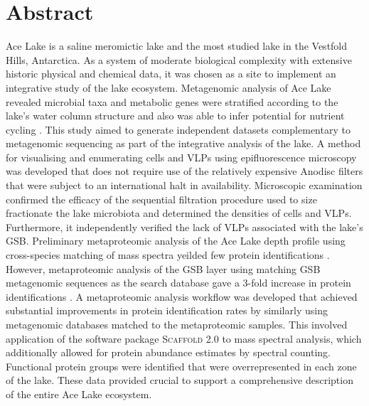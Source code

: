 \section{Abstract}
Ace Lake is a saline meromictic lake and the most studied lake in the Vestfold Hills, Antarctica.
As a system of moderate biological complexity with extensive historic physical and chemical data, it was chosen as a site to implement an integrative study of the lake ecosystem.
Metagenomic analysis of Ace Lake revealed microbial taxa and metabolic genes were stratified according to the lake's water column structure and also was able to infer potential for nutrient cycling \cite{Lauro2011}.
This study aimed to generate independent datasets complementary to metagenomic sequencing as part of the integrative analysis of the lake.
A method for visualising and enumerating cells and \acp{VLP} using epifluorescence microscopy was developed that does not require use of the relatively expensive Anodisc filters that were subject to an international halt in availability.
Microscopic examination confirmed the efficacy of the sequential filtration procedure used to size fractionate the lake microbiota and determined the densities of cells and \acp{VLP}. Furthermore, it independently verified the lack of \acp{VLP} associated with the lake's \ac{GSB}.
Preliminary metaproteomic analysis of the Ace Lake depth profile using cross-species matching of mass spectra yeilded few protein identifications \cite{Ng2010b}.
However, metaproteomic analysis of the \ac{GSB} layer using matching \ac{GSB} metagenomic sequences as the search database gave a 3-fold increase in protein identifications \cite{Ng2010a,Ng2010b}.
A metaproteomic analysis workflow was developed that achieved substantial improvements in protein identification rates by similarly using metagenomic databases matched to the metaproteomic samples.
This involved application of the software package \textsc{Scaffold} 2.0 to mass spectral analysis, which additionally allowed for protein abundance estimates by spectral counting.
Functional protein groups were identified that were overrepresented in each zone of the lake.
These data provided crucial to support a comprehensive description of the entire Ace Lake ecosystem. 

